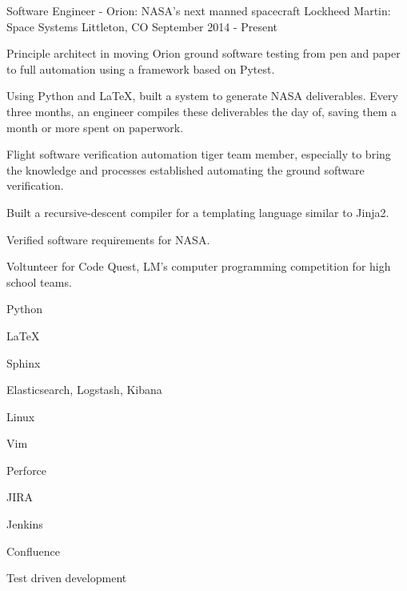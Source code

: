 

\begin{cventries}

  \cventry
    {Software Engineer - Orion: NASA's next manned spacecraft} %
    {Lockheed Martin: Space Systems} %
    {Littleton, CO} %
    {September 2014 - Present} %
    {
      \begin{cvitems} %
        \item {Principle architect in moving Orion ground software testing from pen and paper to full automation using a framework based on Pytest.}
        \item {Using Python and LaTeX, built a system to generate NASA deliverables.  Every three months, an engineer compiles these deliverables the day of, saving them a month or more spent on paperwork.}
        \item {Flight software verification automation tiger team member, especially to bring the knowledge and processes established automating the ground software verification.}
        \item {Built a recursive-descent compiler for a templating language similar to Jinja2.}
        \item {Verified software requirements for NASA.}
        \item {Voltunteer for Code Quest, LM's computer programming competition for high school teams.}
      \end{cvitems}
    }
    \begin{cventryskills}
      \item Python
      \item LaTeX
      \item Sphinx
      \item Elasticsearch, Logstash, Kibana
      \item Linux
      \item Vim
      \item Perforce
      \item JIRA
      \item Jenkins
      \item Confluence
      \item Test driven development
    \end{cventryskills}


\end{cventries}
